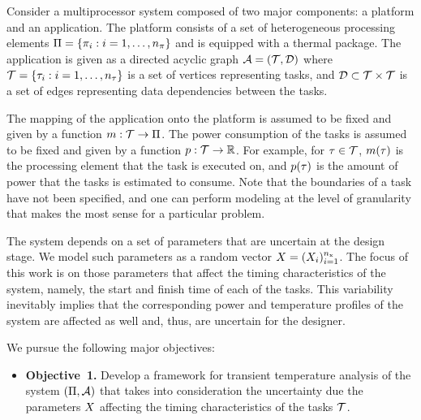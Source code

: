 Consider a multiprocessor system composed of two major components: a platform
and an application. The platform consists of a set of heterogeneous processing
elements $\Pi = \{ \pi_i: i = 1, \dots, {n_\pi} \}$ and is equipped with a
thermal package. The application is given as a directed acyclic graph $\mathcal{A} =
(\mathcal{T}, \mathcal{D})$ where $\mathcal{T} = \{ \tau_i: i = 1, \dots, {n_\tau} \}$ is a set of
vertices representing tasks, and $\mathcal{D} \subset \mathcal{T} \times \mathcal{T}$ is a set
of edges representing data dependencies between the tasks.

The mapping of the application onto the platform is assumed to be fixed and
given by a function $m: \mathcal{T} \to \Pi$. The power consumption of the
tasks is assumed to be fixed and given by a function $p: \mathcal{T} \to
\mathbb{R}$. For example, for $\tau \in \mathcal{T}$, $m(\tau)$ is the
processing element that the task is executed on, and $p(\tau)$ is the
amount of power that the tasks is estimated to consume. Note that the
boundaries of a task have not been specified, and one can perform modeling at
the level of granularity that makes the most sense for a particular problem.

The system depends on a set of parameters that are uncertain at the design
stage. We model such parameters as a random vector $X = (X_i)_{i = 1}^{n_\text{x}}$.
The focus of this work is on those parameters that affect the timing
characteristics of the system, namely, the start and finish time of each of the
tasks. This variability inevitably implies that the corresponding power and
temperature profiles of the system are affected as well and, thus, are
uncertain for the designer.

We pursue the following major objectives:
\begin{itemize}

  \item {\bfseries Objective~1.} Develop a framework for transient temperature
  analysis of the system $(\Pi, \mathcal{A})$ that takes into consideration the
  uncertainty due the parameters $X$ affecting the timing characteristics of
  the tasks $\mathcal{T}$.

\end{itemize}

